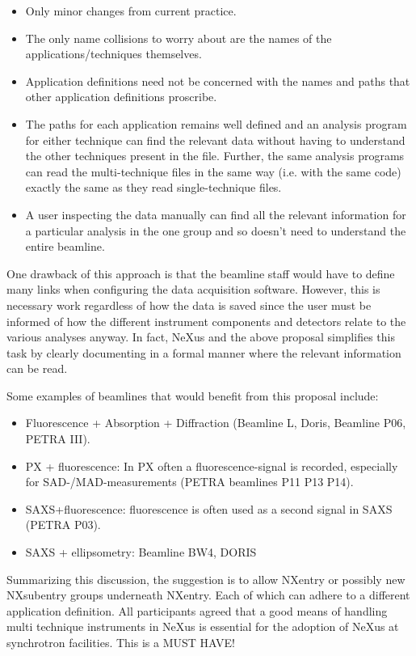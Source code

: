 \documentclass[a4paper]{article}\usepackage[dvips]{graphicx}
\begin{document}
\begin{itemize}\item Only minor changes from current practice.
\item The only name collisions to worry about are the names of the applications/techniques themselves.
\item Application definitions need not be concerned with the names and paths that other application 
  definitions proscribe.
\item The paths for each application remains well defined and an analysis program for either technique can 
  find the relevant data without having to understand the other techniques present in the file. Further, 
  the same analysis programs can read the multi-technique files in the same way (i.e. with the same code) 
  exactly the same as they read single-technique files.
\item A user inspecting the data manually can find all the relevant information for a particular analysis 
  in the one group and so doesn't need to understand the entire beamline.
\end{itemize}
One drawback of this approach is that the beamline staff would have to define many links when configuring 
the data acquisition software. However, this is necessary work regardless of how the data is saved since 
the user must be informed of how the different instrument components and detectors relate to the various 
analyses anyway. In fact, NeXus and the above proposal simplifies this task by clearly documenting in a 
formal manner where the relevant information can be read.


Some examples of beamlines that would benefit from this proposal include:


\begin{itemize}\item Fluorescence + Absorption + Diffraction (Beamline L, Doris, Beamline P06, PETRA III).
\item PX + fluorescence: In PX often a fluorescence-signal is recorded, especially for 
  SAD-/MAD-measurements (PETRA beamlines P11 P13 P14).
\item SAXS+fluorescence: fluorescence is often used as a second signal in SAXS (PETRA P03).
\item SAXS + ellipsometry: Beamline BW4, DORIS
  
\end{itemize}Summarizing this discussion, the suggestion is to allow NXentry or possibly new NXsubentry groups 
underneath NXentry. Each of which can adhere to a different application definition. All participants 
agreed that a good means of handling multi technique instruments in NeXus is essential for the 
adoption of NeXus at synchrotron facilities. This is a MUST HAVE!
\end{document}
